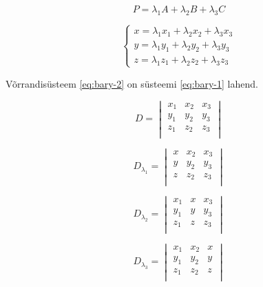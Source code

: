 \documentclass[a4paper,12pt]{report}
\begin{document}
\begin{minipage}{0.40\textwidth}
  \begin{equation} \label{eq:bary-1}
    P = \lambda_1A+\lambda_2B+\lambda_3C
  \end{equation}
\end{minipage}
\begin{minipage}{0.55\textwidth}
  \begin{equation} \label{eq:bary-1-exp}
    \left\{
    \begin{array}{l}
      x = \lambda_1x_1+\lambda_2x_2+\lambda_3x_3 \\
      y = \lambda_1y_1+\lambda_2y_2+\lambda_3y_3 \\
      z = \lambda_1z_1+\lambda_2z_2+\lambda_3z_3
    \end{array}
    \right.
  \end{equation}
\end{minipage}

Võrrandisüsteem \ref{eq:bary-2} on süsteemi \ref{eq:bary-1} lahend.

\begin{center}
\begin{minipage}{0.23\textwidth}
  \[
    D =
    \begin{vmatrix}
      x_1 & x_2 & x_3 \\
      y_1 & y_2 & y_3 \\
      z_1 & z_2 & z_3 \\
    \end{vmatrix}
  \]
\end{minipage}
\begin{minipage}{0.23\textwidth}
  \[
    D_{\lambda_1} =
    \begin{vmatrix}
      x & x_2 & x_3 \\
      y & y_2 & y_3 \\
      z & z_2 & z_3 \\
    \end{vmatrix}
  \]
\end{minipage}
\begin{minipage}{0.23\textwidth}
  \[
    D_{\lambda_2} = 
    \begin{vmatrix}
      x_1 & x & x_3 \\
      y_1 & y & y_3 \\
      z_1 & z & z_3 \\
    \end{vmatrix}
  \]
\end{minipage}
\begin{minipage}{0.23\textwidth}
  \[
    D_{\lambda_3} = 
    \begin{vmatrix}
      x_1 & x_2 & x \\
      y_1 & y_2 & y \\
      z_1 & z_2 & z \\
    \end{vmatrix}
  \]
\end{minipage}
\end{center}
  
\end{document}
